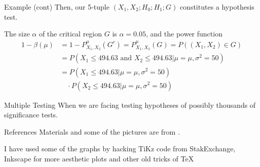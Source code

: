 \documentclass{beamer}
\begin{document}
\begin{frame}{Example (cont)}
	Then, our 5-tuple $(X_1,X_2;H_0;H_1;G)$ constitutes a hypothesis test. 
	
	The size $\alpha$ of the critical region $G$ is $\alpha=0.05$, and the power function
	\begin{equation*}
		\begin{split}
			1-\beta(\mu)&= 1-P^\mu_{X_1,X_2}(G^c)= P^\mu_{X_1,X_2}(G)= P((X_1,X_2)\in G)\\
			&=P(X_1 \le 494.63 \text{ and } X_2 \le 494.63| \mu=\mu, \sigma^2=50) \\
			&=P(X_1 \le 494.63 | \mu=\mu, \sigma^2=50)\\
			&\quad  \cdot P(X_2\le 494.63 | \mu=\mu, \sigma^2=50) 
		\end{split}
	\end{equation*}
\end{frame}

\begin{frame}{Multiple Testing}
	When we are facing testing hypotheses of possibly thousands of significance tests. 
\end{frame}

\begin{frame}{References}
	Materials and some of the pictures are from \citep{pestman}.
	\printbibliography 	
	
	I have used some of the graphs by hacking TiKz code from StakExchange, Inkscape for more aesthetic plots and other old tricks of \TeX
	
\end{frame}
\end{document}
